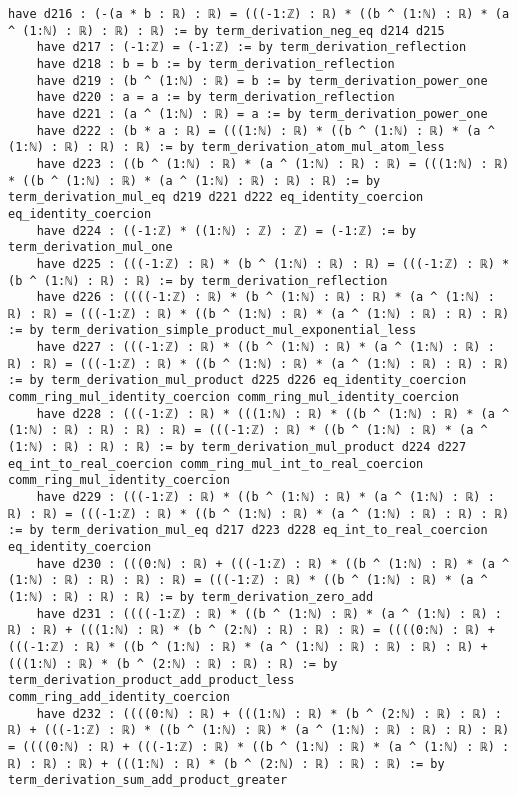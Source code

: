 \documentclass{article}
\begin{document}
\begin{tcolorbox}[colback=white!10, width=\linewidth]
\begin{lstlisting}[language=Lean4]
    have d216 : (-(a * b : ℝ) : ℝ) = (((-1:ℤ) : ℝ) * ((b ^ (1:ℕ) : ℝ) * (a ^ (1:ℕ) : ℝ) : ℝ) : ℝ) := by term_derivation_neg_eq d214 d215
    have d217 : (-1:ℤ) = (-1:ℤ) := by term_derivation_reflection
    have d218 : b = b := by term_derivation_reflection
    have d219 : (b ^ (1:ℕ) : ℝ) = b := by term_derivation_power_one
    have d220 : a = a := by term_derivation_reflection
    have d221 : (a ^ (1:ℕ) : ℝ) = a := by term_derivation_power_one
    have d222 : (b * a : ℝ) = (((1:ℕ) : ℝ) * ((b ^ (1:ℕ) : ℝ) * (a ^ (1:ℕ) : ℝ) : ℝ) : ℝ) := by term_derivation_atom_mul_atom_less
    have d223 : ((b ^ (1:ℕ) : ℝ) * (a ^ (1:ℕ) : ℝ) : ℝ) = (((1:ℕ) : ℝ) * ((b ^ (1:ℕ) : ℝ) * (a ^ (1:ℕ) : ℝ) : ℝ) : ℝ) := by term_derivation_mul_eq d219 d221 d222 eq_identity_coercion eq_identity_coercion
    have d224 : ((-1:ℤ) * ((1:ℕ) : ℤ) : ℤ) = (-1:ℤ) := by term_derivation_mul_one
    have d225 : (((-1:ℤ) : ℝ) * (b ^ (1:ℕ) : ℝ) : ℝ) = (((-1:ℤ) : ℝ) * (b ^ (1:ℕ) : ℝ) : ℝ) := by term_derivation_reflection
    have d226 : ((((-1:ℤ) : ℝ) * (b ^ (1:ℕ) : ℝ) : ℝ) * (a ^ (1:ℕ) : ℝ) : ℝ) = (((-1:ℤ) : ℝ) * ((b ^ (1:ℕ) : ℝ) * (a ^ (1:ℕ) : ℝ) : ℝ) : ℝ) := by term_derivation_simple_product_mul_exponential_less
    have d227 : (((-1:ℤ) : ℝ) * ((b ^ (1:ℕ) : ℝ) * (a ^ (1:ℕ) : ℝ) : ℝ) : ℝ) = (((-1:ℤ) : ℝ) * ((b ^ (1:ℕ) : ℝ) * (a ^ (1:ℕ) : ℝ) : ℝ) : ℝ) := by term_derivation_mul_product d225 d226 eq_identity_coercion comm_ring_mul_identity_coercion comm_ring_mul_identity_coercion
    have d228 : (((-1:ℤ) : ℝ) * (((1:ℕ) : ℝ) * ((b ^ (1:ℕ) : ℝ) * (a ^ (1:ℕ) : ℝ) : ℝ) : ℝ) : ℝ) = (((-1:ℤ) : ℝ) * ((b ^ (1:ℕ) : ℝ) * (a ^ (1:ℕ) : ℝ) : ℝ) : ℝ) := by term_derivation_mul_product d224 d227 eq_int_to_real_coercion comm_ring_mul_int_to_real_coercion comm_ring_mul_identity_coercion
    have d229 : (((-1:ℤ) : ℝ) * ((b ^ (1:ℕ) : ℝ) * (a ^ (1:ℕ) : ℝ) : ℝ) : ℝ) = (((-1:ℤ) : ℝ) * ((b ^ (1:ℕ) : ℝ) * (a ^ (1:ℕ) : ℝ) : ℝ) : ℝ) := by term_derivation_mul_eq d217 d223 d228 eq_int_to_real_coercion eq_identity_coercion
    have d230 : (((0:ℕ) : ℝ) + (((-1:ℤ) : ℝ) * ((b ^ (1:ℕ) : ℝ) * (a ^ (1:ℕ) : ℝ) : ℝ) : ℝ) : ℝ) = (((-1:ℤ) : ℝ) * ((b ^ (1:ℕ) : ℝ) * (a ^ (1:ℕ) : ℝ) : ℝ) : ℝ) := by term_derivation_zero_add
    have d231 : ((((-1:ℤ) : ℝ) * ((b ^ (1:ℕ) : ℝ) * (a ^ (1:ℕ) : ℝ) : ℝ) : ℝ) + (((1:ℕ) : ℝ) * (b ^ (2:ℕ) : ℝ) : ℝ) : ℝ) = ((((0:ℕ) : ℝ) + (((-1:ℤ) : ℝ) * ((b ^ (1:ℕ) : ℝ) * (a ^ (1:ℕ) : ℝ) : ℝ) : ℝ) : ℝ) + (((1:ℕ) : ℝ) * (b ^ (2:ℕ) : ℝ) : ℝ) : ℝ) := by term_derivation_product_add_product_less comm_ring_add_identity_coercion
    have d232 : ((((0:ℕ) : ℝ) + (((1:ℕ) : ℝ) * (b ^ (2:ℕ) : ℝ) : ℝ) : ℝ) + (((-1:ℤ) : ℝ) * ((b ^ (1:ℕ) : ℝ) * (a ^ (1:ℕ) : ℝ) : ℝ) : ℝ) : ℝ) = ((((0:ℕ) : ℝ) + (((-1:ℤ) : ℝ) * ((b ^ (1:ℕ) : ℝ) * (a ^ (1:ℕ) : ℝ) : ℝ) : ℝ) : ℝ) + (((1:ℕ) : ℝ) * (b ^ (2:ℕ) : ℝ) : ℝ) : ℝ) := by term_derivation_sum_add_product_greater

\end{lstlisting}
\end{tcolorbox}
\end{document}
